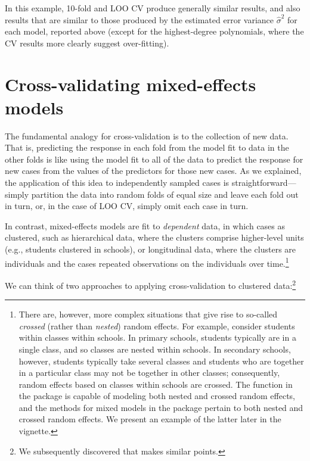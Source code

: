 \documentclass[
]{jss}
\begin{document}
In this example, 10-fold and LOO CV produce generally similar results,
and also results that are similar to those produced by the estimated
error variance \(\widehat{\sigma}^2\) for each model, reported above
(except for the highest-degree polynomials, where the CV results more
clearly suggest over-fitting).

\hypertarget{cross-validating-mixed-effects-models}{%
\section{Cross-validating mixed-effects
models}\label{cross-validating-mixed-effects-models}}

The fundamental analogy for cross-validation is to the collection of new
data. That is, predicting the response in each fold from the model fit
to data in the other folds is like using the model fit to all of the
data to predict the response for new cases from the values of the
predictors for those new cases. As we explained, the application of this
idea to independently sampled cases is straightforward---simply
partition the data into random folds of equal size and leave each fold
out in turn, or, in the case of LOO CV, simply omit each case in turn.

In contrast, mixed-effects models are fit to \emph{dependent} data, in
which cases as clustered, such as hierarchical data, where the clusters
comprise higher-level units (e.g., students clustered in schools), or
longitudinal data, where the clusters are individuals and the cases
repeated observations on the individuals over time.\footnote{There are,
  however, more complex situations that give rise to so-called
  \emph{crossed} (rather than \emph{nested}) random effects. For
  example, consider students within classes within schools. In primary
  schools, students typically are in a single class, and so classes are
  nested within schools. In secondary schools, however, students
  typically take several classes and students who are together in a
  particular class may not be together in other classes; consequently,
  random effects based on classes within schools are crossed. The
   function in the  package is capable of
  modeling both nested and crossed random effects, and the 
  methods for mixed models in the  package pertain to both
  nested and crossed random effects. We present an example of the latter
  later in the vignette.}

We can think of two approaches to applying cross-validation to clustered
data:\footnote{We subsequently discovered that \citet[Section
  8]{Vehtari:2023} makes similar points.}
\end{document}
